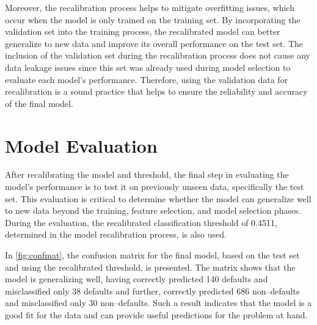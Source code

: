         Moreover, the recalibration process helps to mitigate overfitting issues, which occur when the model is only trained on the training set.
        By incorporating the validation set into the training process, the recalibrated model can better generalize to new data and improve its overall performance on the test set.
        The inclusion of the validation set during the recalibration process does not cause any data leakage issues since this set was already used during model selection to evaluate each model's performance.
        Therefore, using the validation data for recalibration is a sound practice that helps to ensure the reliability and accuracy of the final model.
        
        \section{Model Evaluation}

        After recalibrating the model and threshold, the final step in evaluating the model's performance is to test it on previously unseen data, specifically the test set.
        This evaluation is critical to determine whether the model can generalize well to new data beyond the training, feature selection, and model selection phases.
        During the evaluation, the recalibrated classification threshold of 0.4511, determined in the model recalibration process, is also used.
        
        In \autoref{fig:confmat}, the confusion matrix for the final model, based on the test set and using the recalibrated threshold, is presented. The matrix shows that the model is generalizing well, having correctly predicted 140 defaults and misclassified only 38 defaults and further, correctly predicted 686 non--defaults and misclassified only 30 non--defaults. Such a result indicates that the model is a good fit for the data and can provide useful predictions for the problem at hand.
        
